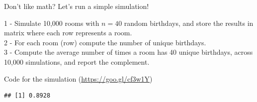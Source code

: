\begin{frame}{Don't like math? Let's run a simple simulation!}

1 - Simulate 10,000 rooms with \(n = 40\) random birthdays, and store
the results in matrix where each row represents a room.\\
2 - For each room (row) compute the number of unique birthdays.\\
3 - Compute the average number of times a room has 40 unique birthdays,
across 10,000 simulations, and report the complement.

\end{frame}

\begin{frame}[fragile]{Code for the simulation
(\url{https://goo.gl/cf3w1Y})}

\begin{Shaded}
\begin{Highlighting}[]
\StringTok{ }
\StringTok{ }\NormalTok{(}\NormalTok{(}\OperatorTok{*}\StringTok{ }
                                 \NormalTok{, }\NormalTok{)), }
\StringTok{ }
\StringTok{ }\NormalTok{(}
\OperatorTok{==}\StringTok{ }
\StringTok{ } \OperatorTok{-}\StringTok{ }
\NormalTok{\}}
\StringTok{ }
\StringTok{ }
\end{Highlighting}
\end{Shaded}

\begin{verbatim}
## [1] 0.8928
\end{verbatim}

\end{frame}

